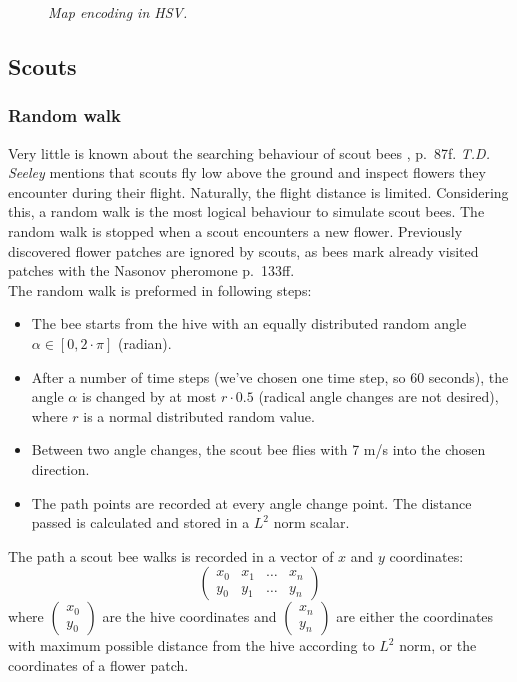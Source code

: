 	\begin{figure}
		\centering
		\caption{\textit{Map encoding in HSV.}}
		\label{fig:hsvEncoding}
	\end{figure}
	
	
\subsection{Scouts}
	\subsubsection{Random walk}
		Very little is known about the searching behaviour of scout bees \cite{seeley95}, p.~87f. \textit{T.D. Seeley} mentions that scouts fly low above the ground and inspect flowers they encounter during their flight. Naturally, the flight distance is limited. Considering this, a random walk is the most logical behaviour to simulate scout bees. The random walk is stopped when a scout encounters a new flower. Previously discovered flower patches are ignored by scouts, as bees mark already visited patches with the Nasonov pheromone \cite{winston91} p.~133ff.\\
		The random walk is preformed in following steps:
		\begin{itemize}
			\item The bee starts from the hive with an equally distributed random angle $\alpha \in [0, 2 \cdot \pi]$ (radian).
			\item After a number of time steps (we've chosen one time step, so 60 seconds), the angle $\alpha$ is changed by at most $r\cdot0.5$ (radical angle changes are not desired), where $r$ is a normal distributed random value.
			\item Between two angle changes, the scout bee flies with 7 m/s into the chosen direction.
			\item The path points are recorded at every angle change point. The distance passed is calculated and stored in a $L^2$ norm scalar.
		\end{itemize}
		
		The path a scout bee walks is recorded in a vector of $x$ and $y$ coordinates:
		\[\begin{pmatrix}
			x_0 & x_1 & \ldots & x_n \\ y_0 & y_1 & \ldots & y_n
		\end{pmatrix}\]
		where $\begin{pmatrix} x_0 \\ y_0 \end{pmatrix}$ are the hive coordinates and $\begin{pmatrix} x_n \\ y_n \end{pmatrix}$ are either the coordinates with maximum possible distance from the hive according to $L^2$ norm, or the coordinates of a flower patch.\\
		
